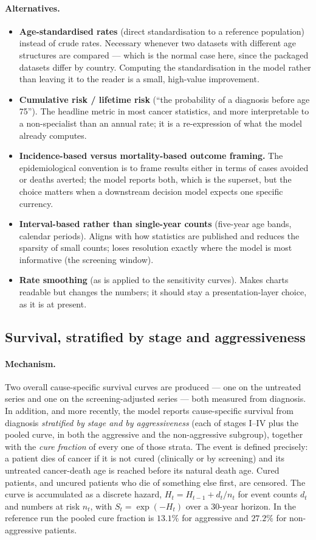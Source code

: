 \documentclass[12pt,a4paper]{article}
\newcommand{\mech}[1]{\paragraph{Mechanism.} #1}
\newcommand{\alt}[1]{\paragraph{Alternatives.} #1}
\begin{document}
\alt{\begin{itemize}[nosep]
  \item \textbf{Age-standardised rates} (direct standardisation to a reference population) instead of crude
        rates. Necessary whenever two datasets with different age structures are compared --- which is the
        normal case here, since the packaged datasets differ by country. Computing the standardisation in
        the model rather than leaving it to the reader is a small, high-value improvement.
  \item \textbf{Cumulative risk / lifetime risk} (``the probability of a diagnosis before age 75''). The
        headline metric in most cancer statistics, and more interpretable to a non-specialist than an
        annual rate; it is a re-expression of what the model already computes.
  \item \textbf{Incidence-based versus mortality-based outcome framing.} The epidemiological convention is
        to frame results either in terms of cases avoided or deaths averted; the model reports both, which
        is the superset, but the choice matters when a downstream decision model expects one specific
        currency.
  \item \textbf{Interval-based rather than single-year counts} (five-year age bands, calendar periods).
        Aligns with how statistics are published and reduces the sparsity of small counts; loses resolution
        exactly where the model is most informative (the screening window).
  \item \textbf{Rate smoothing} (as is applied to the sensitivity curves). Makes charts readable but changes
        the numbers; it should stay a presentation-layer choice, as it is at present.
\end{itemize}}

\subsection{Survival, stratified by stage and aggressiveness}
\label{sec:survival}

\mech{Two overall cause-specific survival curves are produced --- one on the untreated series and one on the
screening-adjusted series --- both measured from diagnosis. In addition, and more recently, the model
reports cause-specific survival from diagnosis \emph{stratified by stage and by aggressiveness} (each of
stages I--IV plus the pooled curve, in both the aggressive and the non-aggressive subgroup), together with
the \emph{cure fraction} of every one of those strata. The event is defined precisely: a patient dies of
cancer if it is not cured (clinically or by screening) and its untreated cancer-death age is reached before
its natural death age. Cured patients, and uncured patients who die of something else first, are censored.
The curve is accumulated as a discrete hazard, $H_t = H_{t-1} + d_t/n_t$ for event counts $d_t$ and numbers
at risk $n_t$, with $S_t = \exp(-H_t)$ over a 30-year horizon. In the reference run the pooled cure fraction
is $13.1\%$ for aggressive and $27.2\%$ for non-aggressive patients.}
\end{document}
